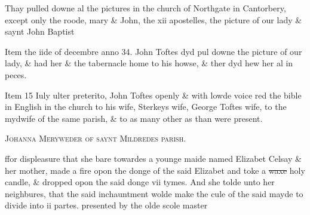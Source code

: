 \documentclass[12pt, a4paper]{book}
\begin{document}
				\marginpar[\vspace{0.5cm}{\textcolor{Gray}{images}}]{}
			
	
		\ifthenelse{\isodd{\thepage}}
		{\reversemarginpar}
		{\normalmarginpar}
		Thay pulled downe al the pictures in the church of Northgate
		in Cantorbery, except only the roode, mary \& John, the
 xii apostelles, the picture of our lady \& saynt John Baptist
	
		\ifthenelse{\isodd{\thepage}}
		{\reversemarginpar}
		{\normalmarginpar}
		Item the iide of decembre anno 34. John Toftes dyd pul downe
 the picture of our lady, \& had her \& the tabernacle home
 to his howse, \& ther dyd hew her al in peces.
	
		\ifthenelse{\isodd{\thepage}}
		{\reversemarginpar}
		{\normalmarginpar}
		Item 15 Iuly ulter preterito, John Toftes openly \& with lowde
 voice red the bible in English in the church to his wife,
 	Sterkeys wife, George Toftes wife, to the mydwife of the
 same parish, \& to as many other as than were present.
 

            
            
               
				\begin{center} \begin{large} {\scshape Johanna Meryweder of saynt Mildredes parish.} \end{large} \end{center}
			

 
 	
				\marginpar[\vspace{0.5cm}{\textcolor{Gray}{superstition}}]{}
			
 	
				\marginpar[\vspace{0.5cm}{\textcolor{Gray}{n}}]{}
			
 	
				\marginpar[\vspace{0.5cm}{\textcolor{Gray}{she dyd ytt not but sayd she wold do ytt}}]{}
			
 	
		\ifthenelse{\isodd{\thepage}}
		{\reversemarginpar}
		{\normalmarginpar}
		ffor displeasure that she bare towardes a younge maide named
			 Elizabet Celsay \&
 	her mother, made a fire opon the donge of the said Elizabet
 		and toke a \sout{waxe} holy
			 candle, \& dropped opon the said donge vii
 tymes. And she tolde unto her neighbures, that the said
 inchauntment wolde make the cule of the said mayde to
 divide into ii partes. presented by the olde scole master
 
\end{document}
